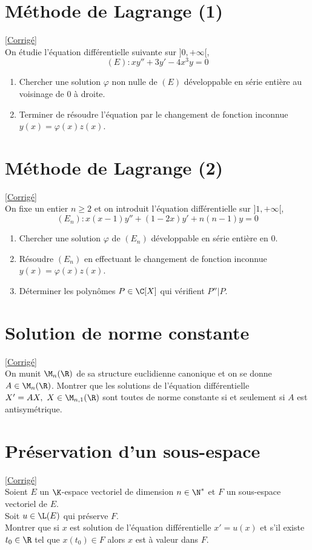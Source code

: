 \documentclass{book}
\begin{document}
\section{Méthode de Lagrange (1) }
\textcolor{blue}{\hyperref[Méthode de Lagrange (1) corrigé]{[Corrigé]}}\\
\label{Méthode de Lagrange (1)}
On étudie l'équation différentielle suivante sur $]0,+\infty[$,$$(E):xy''+3y'-4x^3y=0$$
\begin{enumerate}
	\item Chercher une solution $\varphi$ non nulle de $(E)$ développable en série entière au voisinage de $0$ à droite.
	\item Terminer de résoudre l'équation par le changement de fonction inconnue $y(x)=\varphi(x)z(x)$.
\end{enumerate}

\section{Méthode de Lagrange (2)}
\textcolor{blue}{\hyperref[sec:methode-de-lagrange-2]{[Corrigé]}}\\
\label{Méthode de Lagrange 2}
On fixe un entier $n\geq 2$ et on introduit l'équation différentielle sur $]1,+\infty[$,
$$(E_n):x(x-1)y''+(1-2x)y'+n(n-1)y=0$$
\begin{enumerate}
	\item Chercher une solution $\varphi$ de $(E_n)$ développable en série entière en $0$.
	\item Résoudre $(E_n)$ en effectuant le changement de fonction inconnue $y(x)=\varphi(x)z(x)$.
	\item Déterminer les polynômes $P\in \C[X]$ qui vérifient $P''|P$.
\end{enumerate}

\section{Solution de norme constante }
\textcolor{blue}{\hyperref[Solution de norme constante corrigé]{[Corrigé]}}\\
\label{Solution de norme constante}
On munit $\M_n(\R)$ de sa structure euclidienne canonique et on se donne $A\in \M_n(\R)$. Montrer que les solutions de l'équation différentielle $X'=AX,\ X\in \M_{n,1}(\R)$ sont toutes de norme constante si et seulement si $A$ est antisymétrique.

\section{Préservation d'un sous-espace }
\textcolor{blue}{\hyperref[Préservation d'un sous-espace corrigé]{[Corrigé]}}\\
\label{Préservation d'un sous-espace}
Soient $E$ un $\K$-espace vectoriel de dimension $n\in \N^*$ et $F$ un sous-espace vectoriel de $E$.\\
Soit $u\in \L(E)$ qui préserve $F$.\\
Montrer que si $x$ est solution de l'équation différentielle $x'=u(x)$ et s'il existe $t_0\in \R$ tel que $x(t_0)\in F$ alors $x$ est à valeur dans $F$.
\end{document}
